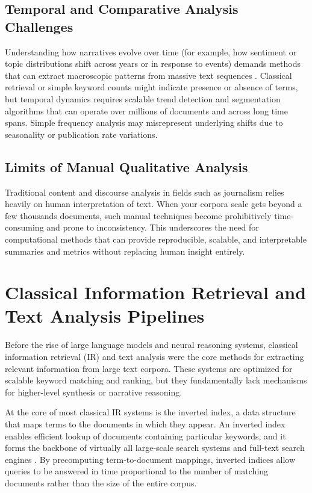 \subsection{Temporal and Comparative Analysis Challenges}

Understanding how narratives evolve over time (for example, how sentiment or topic distributions shift across years or in response to events) demands methods that can extract macroscopic patterns from massive text sequences \cite{lansdall2018history}. Classical retrieval or simple keyword counts might indicate presence or absence of terms, but temporal dynamics requires scalable trend detection and segmentation algorithms that can operate over millions of documents and across long time spans. Simple frequency analysis may misrepresent underlying shifts due to seasonality or publication rate variations.

\subsection{Limits of Manual Qualitative Analysis}

Traditional content and discourse analysis in fields such as journalism relies heavily on human interpretation of text. When your corpora scale gets beyond a few thousands documents, such manual techniques become prohibitively time-consuming and prone to inconsistency. This underscores the need for computational methods that can provide reproducible, scalable, and interpretable summaries and metrics without replacing human insight entirely.


\section{Classical Information Retrieval and Text Analysis Pipelines}

Before the rise of large language models and neural reasoning systems, classical information retrieval (IR) and text analysis were the core methods for extracting relevant information from large text corpora. These systems are optimized for scalable keyword matching and ranking, but they fundamentally lack mechanisms for higher-level synthesis or narrative reasoning.

At the core of most classical IR systems is the inverted index, a data structure that maps terms to the documents in which they appear. An inverted index enables efficient lookup of documents containing particular keywords, and it forms the backbone of virtually all large-scale search systems and full-text search engines \cite{ir_inverted_index}. By precomputing term-to-document mappings, inverted indices allow queries to be answered in time proportional to the number of matching documents rather than the size of the entire corpus.

